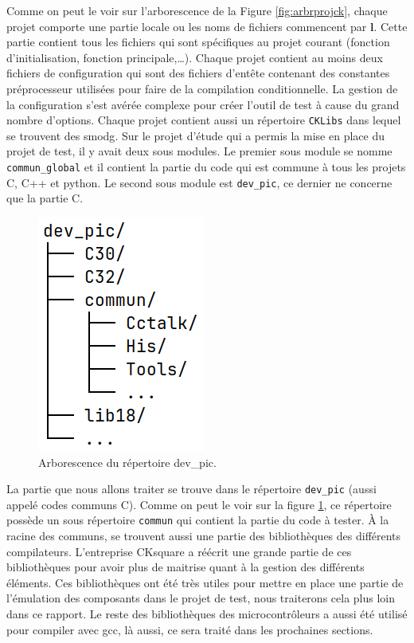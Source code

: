 \documentclass[a4paper]{article}
\begin{document}
Comme on peut le voir sur l'arborescence de la Figure \ref{fig:arbrprojck},
chaque projet comporte une partie locale ou les noms de fichiers commencent par
\textbf{l}. Cette partie contient tous les fichiers qui sont spécifiques au
projet courant (fonction d'initialisation, fonction principale,\dots). Chaque
projet contient au moins deux fichiers de configuration qui sont des fichiers
d'entête contenant des constantes préprocesseur utilisées pour faire de la
compilation conditionnelle. La gestion de la configuration s'est avérée complexe
pour créer l'outil de test à cause du grand nombre d'options. Chaque projet
contient aussi un répertoire \verb|CKLibs| dans lequel se trouvent des
\gls{smodg}. Sur le projet d'étude qui a permis la mise en place du projet de
test, il y avait deux sous modules. Le premier sous module se nomme
\verb|commun_global| et il contient la partie du code qui est commune à tous les
projets C, C++ et python. Le second sous module est \verb|dev_pic|, ce dernier ne
concerne que la partie C.

\begin{figure}[h!]
  \begin{center}
    \includegraphics[scale=0.5]{./img/arborescence-devpic.png}
    \caption{Arborescence du répertoire dev\_pic.}
    \label{fig:repdevpic}
  \end{center}
\end{figure}

La partie que nous allons traiter se trouve dans le répertoire \verb|dev_pic|
(aussi appelé codes communs C). Comme on peut le voir sur la figure
\ref{fig:repdevpic}, ce répertoire possède un sous répertoire \verb|commun| qui
contient la partie du code à tester. À la racine des communs, se trouvent aussi
une partie des bibliothèques des différents compilateurs. L'entreprise CKsquare
a réécrit une grande partie de ces bibliothèques pour avoir plus de maitrise
quant à la gestion des différents éléments. Ces bibliothèques ont été très
utiles pour mettre en place une partie de l'émulation des composants dans le
projet de test, nous traiterons cela plus loin dans ce rapport. Le reste des
bibliothèques des microcontrôleurs a aussi été utilisé pour compiler avec gcc,
là aussi, ce sera traité dans les prochaines sections.
\end{document}
